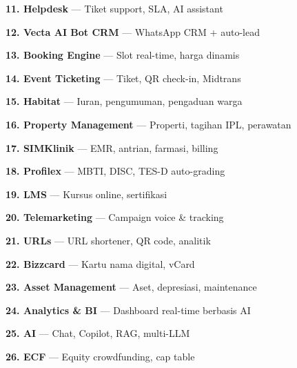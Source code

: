 \documentclass[a4paper]{article}
\begin{document}
{\begin{minipage}[t]{\dimexpr\textwidth-2\fboxsep}
\begin{minipage}[t]{0.48\linewidth}
{    \textbf{\color{BluePrimary}11. Helpdesk} — Tiket support, SLA, AI assistant\par\vspace{2pt}%
    \textbf{\color{BluePrimary}12. Vecta AI Bot CRM} — WhatsApp CRM + auto-lead\par\vspace{2pt}%
    \textbf{\color{BluePrimary}13. Booking Engine} — Slot real-time, harga dinamis}%
\end{minipage}%
\hfill
\begin{minipage}[t]{0.48\linewidth}
    {\fontsize{9}{12}\selectfont\color{TextDark}%
    \textbf{\color{BluePrimary}14. Event Ticketing} — Tiket, QR check-in, Midtrans\par\vspace{2pt}%
    \textbf{\color{BluePrimary}15. Habitat} — Iuran, pengumuman, pengaduan warga\par\vspace{2pt}%
    \textbf{\color{BluePrimary}16. Property Management} — Properti, tagihan IPL, perawatan\par\vspace{2pt}%
    \textbf{\color{BluePrimary}17. SIMKlinik} — EMR, antrian, farmasi, billing\par\vspace{2pt}%
    \textbf{\color{BluePrimary}18. Profilex} — MBTI, DISC, TES-D auto-grading\par\vspace{2pt}%
    \textbf{\color{BluePrimary}19. LMS} — Kursus online, sertifikasi\par\vspace{2pt}%
    \textbf{\color{BluePrimary}20. Telemarketing} — Campaign voice \& tracking\par\vspace{2pt}%
    \textbf{\color{BluePrimary}21. URLs} — URL shortener, QR code, analitik\par\vspace{2pt}%
    \textbf{\color{BluePrimary}22. Bizzcard} — Kartu nama digital, vCard\par\vspace{2pt}%
    \textbf{\color{BluePrimary}23. Asset Management} — Aset, depresiasi, maintenance\par\vspace{2pt}%
    \textbf{\color{BluePrimary}24. Analytics \& BI} — Dashboard real-time berbasis AI\par\vspace{2pt}%
    \textbf{\color{BluePrimary}25. AI} — Chat, Copilot, RAG, multi-LLM\par\vspace{2pt}%
    \textbf{\color{BluePrimary}26. ECF} — Equity crowdfunding, cap table}%
\end{minipage}%
\hspace{6pt}%
\end{minipage}}
\end{document}
